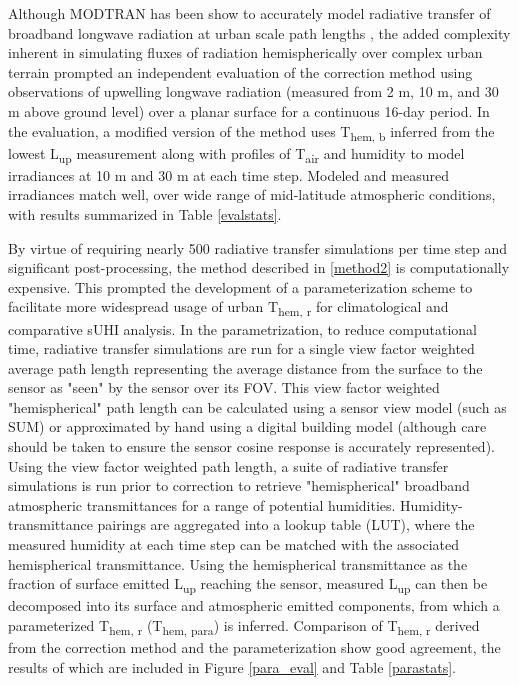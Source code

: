 \begin{bibunit}
Although MODTRAN has been show to accurately model radiative transfer of broadband longwave radiation at urban scale path lengths \citep{Hoch2005, Hoch2007}, the added complexity inherent in simulating fluxes of radiation hemispherically over complex urban terrain prompted an independent evaluation of the correction method using observations of upwelling longwave radiation (measured from 2 \si{\meter}, 10 \si{\meter}, and 30 \si{\meter} above ground level) over a planar surface for a continuous 16-day period. In the evaluation, a modified version of the method uses T\textsubscript{hem, b} inferred from the lowest L\textsubscript{up} measurement along with profiles of T\textsubscript{air} and humidity to model irradiances at 10 \si{\meter} and 30 \si{\meter} at each time step. Modeled and measured irradiances match well, over wide range of mid-latitude atmospheric conditions, with results summarized in Table \ref{evalstats}.

By virtue of requiring nearly 500 radiative transfer simulations per time step and significant post-processing, the method described in \ref{method2} is computationally expensive. This prompted the development of a parameterization scheme to facilitate more widespread usage of urban T\textsubscript{hem, r} for climatological and comparative sUHI analysis. In the parametrization, to reduce computational time, radiative transfer simulations are run for a single view factor weighted average path length representing the average distance from the surface to the sensor as "seen" by the sensor over its FOV. This view factor weighted "hemispherical" path length can be calculated using a sensor view model (such as SUM) or approximated by hand using a digital building model (although care should be taken to ensure the sensor cosine response is accurately represented). Using the view factor weighted path length, a suite of radiative transfer simulations is run prior to correction to retrieve "hemispherical" broadband atmospheric transmittances for a range of potential humidities. Humidity-transmittance pairings are aggregated into a lookup table (LUT), where the measured humidity at each time step can be matched with the associated hemispherical transmittance. Using the hemispherical transmittance as the fraction of surface emitted L\textsubscript{up} reaching the sensor, measured L\textsubscript{up} can then be decomposed into its surface and atmospheric emitted components, from which a parameterized T\textsubscript{hem, r} (T\textsubscript{hem, para}) is inferred. Comparison of T\textsubscript{hem, r} derived from the correction method and the parameterization show good agreement, the results of which are included in Figure \ref{para_eval} and Table \ref{parastats}.


\end{bibunit}

